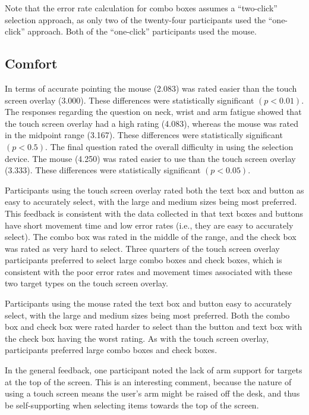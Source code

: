 \documentclass{elsart}
\begin{document}
Note that the error rate calculation for combo boxes assumes a
``two-click'' selection approach, as only two of the twenty-four
participants used the ``one-click'' approach. Both of the ``one-click''
participants used the mouse.


\subsection{Comfort}
\label{sec-results-comfort}

In terms of accurate pointing the mouse (2.083) was rated easier than
the touch screen overlay (3.000). These differences were statistically
significant \((p < 0.01)\). The responses regarding the question on
neck, wrist and arm fatigue showed that the touch screen overlay had a
high rating (4.083), whereas the mouse was rated in the midpoint range
(3.167). These differences were statistically significant \((p < 0.5)\).
The final question rated the overall difficulty in using the selection
device. The mouse (4.250) was rated easier to use than the touch screen
overlay (3.333). These differences were statistically significant \((p <
0.05)\).

Participants using the touch screen overlay rated both the text box and
button as easy to accurately select, with the large and medium sizes
being most preferred. This feedback is consistent with the data
collected in that text boxes and buttons have short movement time and
low error rates (i.e., they are easy to accurately select). The combo
box was rated in the middle of the range, and the check box was rated as
very hard to select. Three quarters of the touch screen overlay
participants preferred to select large combo boxes and check boxes,
which is consistent with the poor error rates and movement times
associated with these two target types on the touch screen overlay.

Participants using the mouse rated the text box and button easy to
accurately select, with the large and medium sizes being most preferred.
Both the combo box and check box were rated harder to select than the
button and text box with the check box having the worst rating. As with
the touch screen overlay, participants preferred large combo boxes and
check boxes.

In the general feedback, one participant noted the lack of arm support
for targets at the top of the screen. This is an interesting comment,
because the nature of using a touch screen means the user's arm might be
raised off the desk, and thus be self-supporting when selecting items
towards the top of the screen.
\end{document}
